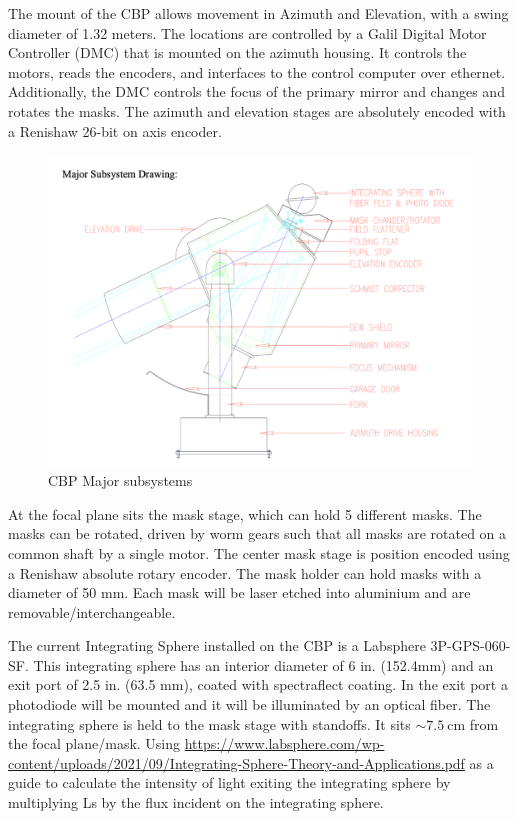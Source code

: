 \documentclass[SE,authoryear,lsstdraft,toc]{lsstdoc}
\begin{document}
The mount of the CBP allows movement in Azimuth and Elevation, with a swing
diameter of 1.32 meters.
The locations are controlled by a Galil Digital Motor Controller (DMC) that is mounted on the azimuth housing. It controls the motors, reads the encoders, and interfaces to the control computer over ethernet. 
Additionally, the DMC controls the focus of the primary mirror and changes and rotates the masks. 
The azimuth and elevation stages are absolutely encoded with a Renishaw 26-bit on axis encoder. 


\begin{figure}[h]
    \centering
    \includegraphics[width=\textwidth]{cbp_drawing.png}
    \caption{CBP Major subsystems}
    \label{fig:cbp_major_subsystems}
\end{figure}

At the focal plane sits the mask stage, which can hold 5 different masks. The masks can be rotated, driven by worm gears such that all masks are rotated on a common shaft by a single motor. The center mask stage is position encoded using a Renishaw absolute rotary encoder. The mask holder can hold masks with a diameter of 50 mm. Each mask will be laser etched into aluminium and are removable/interchangeable. 

The current Integrating Sphere installed on the CBP is a Labsphere 3P-GPS-060-SF. 
This integrating sphere has an interior diameter of 6 in. (152.4mm) and an exit port of 2.5 in. (63.5 mm), coated with spectraflect coating. 
In the exit port a photodiode will be mounted and it will be illuminated by an optical fiber.
The integrating sphere is held to the mask stage with standoffs. 
It sits $\sim 7.5~\mathrm{cm}$ from the focal plane/mask. 
Using \url{https://www.labsphere.com/wp-content/uploads/2021/09/Integrating-Sphere-Theory-and-Applications.pdf} as a guide to calculate the intensity of light exiting the integrating sphere by multiplying Ls by the flux incident on the integrating sphere.
\end{document}
